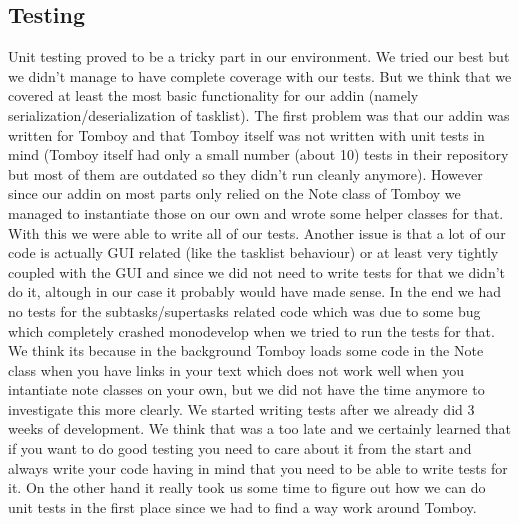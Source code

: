 \subsection{Testing}
\label{testing}
Unit testing proved to be a tricky part in our environment. We tried our best but we didn't manage to have complete coverage with our tests. But we think that we covered at least the most basic functionality for our addin (namely serialization/deserialization of tasklist).
The first problem was that our addin was written for Tomboy and that Tomboy itself was not written with unit tests in mind (Tomboy itself had only a small number (about 10) tests in their repository but most of them are outdated so they didn't run cleanly anymore). However since our addin on most parts only relied on the Note class of Tomboy we managed to instantiate those on our own and wrote some helper classes for that. With this we were able to write all of our tests.
Another issue is that a lot of our code is actually GUI related (like the tasklist behaviour) or at least very tightly coupled with the GUI and since we did not need to write tests for that we didn't do it, altough in our case it probably would have made sense.
In the end we had no tests for the subtasks/supertasks related code which was due to some bug which completely crashed monodevelop when we tried to run the tests for that. We think its because in the background Tomboy loads some code in the Note class when you have links in your text which does not work well when you intantiate note classes on your own, but we did not have the time anymore to investigate this more clearly.
We started writing tests after we already did 3 weeks of development. We think that was a too late and we certainly learned that if you want to do good testing you need to care about it from the start and always write your code having in mind that you need to be able to write tests for it. On the other hand it really took us some time to figure out how we can do unit tests in the first place since we had to find a way work around Tomboy.